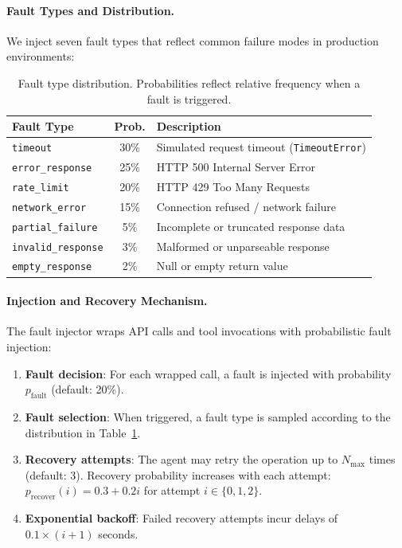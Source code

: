 \documentclass[11pt]{article}
\begin{document}
\paragraph{Fault Types and Distribution.}

We inject seven fault types that reflect common failure modes in production environments:

\begin{table}[h]
\centering
\renewcommand{\arraystretch}{1.2}
\caption{Fault type distribution. Probabilities reflect relative frequency when a fault is triggered.}
\label{tab:fault_types}
\begin{tabularx}{\linewidth}{l c X}
\toprule
\textbf{Fault Type} & \textbf{Prob.} & \textbf{Description} \\
\midrule
\texttt{timeout} & 30\% & Simulated request timeout (\texttt{TimeoutError}) \\
\texttt{error\_response} & 25\% & HTTP 500 Internal Server Error \\
\texttt{rate\_limit} & 20\% & HTTP 429 Too Many Requests \\
\texttt{network\_error} & 15\% & Connection refused / network failure \\
\texttt{partial\_failure} & 5\% & Incomplete or truncated response data \\
\texttt{invalid\_response} & 3\% & Malformed or unparseable response \\
\texttt{empty\_response} & 2\% & Null or empty return value \\
\bottomrule
\end{tabularx}
\end{table}

\paragraph{Injection and Recovery Mechanism.}

The fault injector wraps API calls and tool invocations with probabilistic fault injection:

\begin{enumerate}[leftmargin=*]
    \item \textbf{Fault decision}: For each wrapped call, a fault is injected with probability $p_{\text{fault}}$ (default: 20\%).
    \item \textbf{Fault selection}: When triggered, a fault type is sampled according to the distribution in Table~\ref{tab:fault_types}.
    \item \textbf{Recovery attempts}: The agent may retry the operation up to $N_{\text{max}}$ times (default: 3). Recovery probability increases with each attempt: $p_{\text{recover}}(i) = 0.3 + 0.2i$ for attempt $i \in \{0, 1, 2\}$.
    \item \textbf{Exponential backoff}: Failed recovery attempts incur delays of $0.1 \times (i+1)$ seconds.
\end{enumerate}
\end{document}
